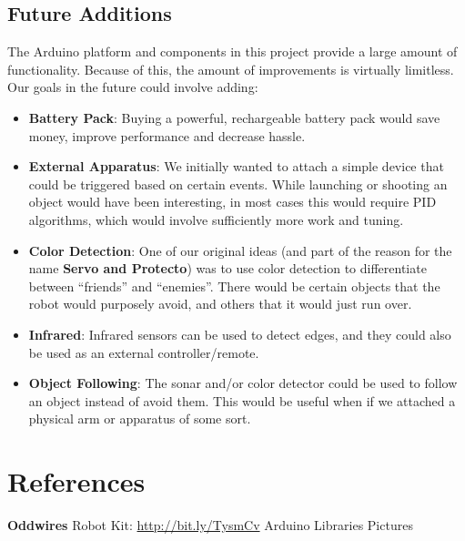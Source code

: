 \documentclass[11pt]{article}
\begin{document}
\subsection{Future Additions}
The Arduino platform and components in this project provide a large amount of functionality.  Because of this, the amount of improvements is virtually limitless.  Our goals in the future could involve adding:
		\begin{itemize}				
		\item \textbf{Battery Pack}: Buying a powerful, rechargeable battery pack would save money, improve performance and decrease hassle.
		\item \textbf{External Apparatus}: We initially wanted to attach a simple device that could be triggered based on certain events.  While launching or shooting an object would have been interesting, in most cases this would require PID algorithms, which would involve sufficiently more work and tuning.
		\item \textbf{Color Detection}: One of our original ideas (and part of the reason for the name \textbf{Servo and Protecto}) was to use color detection to differentiate between ``friends'' and ``enemies''.  There would be certain objects that the robot would purposely avoid, and others that it would just run over.
		\item \textbf{Infrared}: Infrared sensors can be used to detect edges, and they could also be used as an external controller/remote.
		\item \textbf{Object Following}: The sonar and/or color detector could be used to follow an object instead of avoid them.  This would be useful when if we attached a physical arm or apparatus of some sort.
		\end{itemize}

\section{References}
\textbf{Oddwires} Robot Kit:  \url{http://bit.ly/TysmCv}
Arduino Libraries
Pictures
\end{document}

